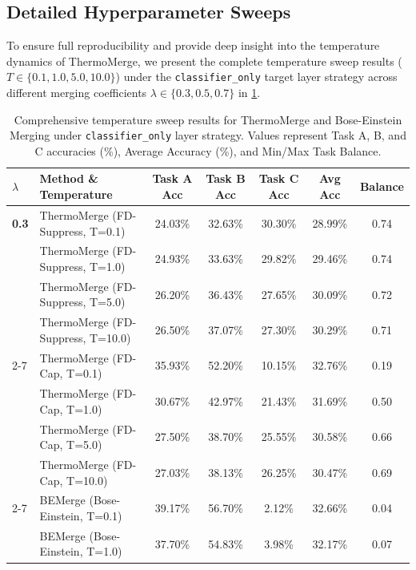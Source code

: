 \documentclass{article}
\theoremstyle{plain}
\theoremstyle{definition}
\theoremstyle{remark}
\begin{document}
\subsection{Detailed Hyperparameter Sweeps}
To ensure full reproducibility and provide deep insight into the temperature dynamics of ThermoMerge, we present the complete temperature sweep results ($T \in \{0.1, 1.0, 5.0, 10.0\}$) under the \texttt{classifier\_only} target layer strategy across different merging coefficients $\lambda \in \{0.3, 0.5, 0.7\}$ in \cref{tab:sweep_all}.

\begin{table}[h]
\caption{Comprehensive temperature sweep results for ThermoMerge and Bose-Einstein Merging under \texttt{classifier\_only} layer strategy. Values represent Task A, B, and C accuracies (\%), Average Accuracy (\%), and Min/Max Task Balance.}
\label{tab:sweep_all}
\vskip 0.15in
\begin{center}
\begin{footnotesize}
\setlength{\tabcolsep}{5pt}
\begin{tabular}{llccccc}
\toprule
$\lambda$ & Method \& Temperature & Task A Acc & Task B Acc & Task C Acc & Avg Acc & Balance \\
\midrule
\textbf{0.3} & ThermoMerge (FD-Suppress, T=0.1) & 24.03\% & 32.63\% & 30.30\% & 28.99\% & 0.74 \\
             & ThermoMerge (FD-Suppress, T=1.0) & 24.93\% & 33.63\% & 29.82\% & 29.46\% & 0.74 \\
             & ThermoMerge (FD-Suppress, T=5.0) & 26.20\% & 36.43\% & 27.65\% & 30.09\% & 0.72 \\
             & ThermoMerge (FD-Suppress, T=10.0) & 26.50\% & 37.07\% & 27.30\% & 30.29\% & 0.71 \\
\cmidrule{2-7}
             & ThermoMerge (FD-Cap, T=0.1) & 35.93\% & 52.20\% & 10.15\% & 32.76\% & 0.19 \\
             & ThermoMerge (FD-Cap, T=1.0) & 30.67\% & 42.97\% & 21.43\% & 31.69\% & 0.50 \\
             & ThermoMerge (FD-Cap, T=5.0) & 27.50\% & 38.70\% & 25.55\% & 30.58\% & 0.66 \\
             & ThermoMerge (FD-Cap, T=10.0) & 27.03\% & 38.13\% & 26.25\% & 30.47\% & 0.69 \\
\cmidrule{2-7}
             & BEMerge (Bose-Einstein, T=0.1) & 39.17\% & 56.70\% & 2.12\% & 32.66\% & 0.04 \\
             & BEMerge (Bose-Einstein, T=1.0) & 37.70\% & 54.83\% & 3.98\% & 32.17\% & 0.07 \\

\end{tabular}
\end{footnotesize}
\end{center}
\end{table}
\end{document}
